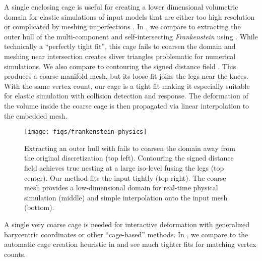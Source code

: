 A single enclosing cage is useful for creating a lower dimensional volumetric
domain for elastic simulations of input models that are either too high
resolution or complicated by meshing imperfections \cite{Xu:2014:SDF}.
%
In , we compare to extracting the outer hull of
the multi-component and self-intersecting \emph{Frankenstein} using
\cite{Jacobson:WN:2013}.
%
While technically a ``perfectly tight fit'', this cage fails to coarsen the
domain and meshing near intersection creates sliver triangles problematic for
numerical simulations.
%
We also compare to contouring the signed distance field \cite{Xu:2014:SDF}.
This produces a coarse manifold mesh, but its loose fit joins the legs near the
knees.
%
With the same vertex count, our cage is a tight fit making it especially
suitable for elastic simulation with collision detection and response.
%
The deformation of the volume inside the coarse cage is then propagated via
linear interpolation to the embedded mesh.

\begin{figure}
  \texttt{[image: figs/frankenstein-physics]}
  \caption{Extracting an outer hull with \protect\cite{Jacobson:WN:2013} fails
  to coarsen the domain away from the original discretization (top left). Contouring
  the signed distance field \protect\cite{Xu:2014:SDF} achieves true nesting at
  a large iso-level fusing the legs (top center). Our method fits the input
  tightly (top right). The coarse mesh provides a low-dimensional domain for
  real-time physical simulation (middle) and simple interpolation onto the
  input mesh (bottom).}
  \label{fig:frankenstein-physics}
\end{figure}


A single very coarse cage is needed for interactive deformation with
generalized barycentric coordinates or other ``cage-based'' methods.
%
In , we compare to the automatic cage creation
heuristic in \cite{Ben-Chen:2009:SDT} and see much tighter fits for matching
vertex counts.

